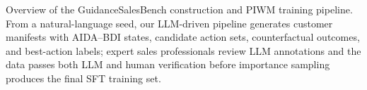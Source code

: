 
\caption{Overview of the GuidanceSalesBench construction and PIWM training pipeline. From a natural-language seed, our LLM-driven pipeline generates customer manifests with AIDA--BDI states, candidate action sets, counterfactual outcomes, and best-action labels; expert sales professionals review LLM annotations and the data passes both LLM and human verification before importance sampling produces the final SFT training set.}

